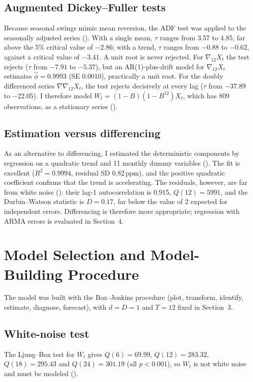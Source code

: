 \documentclass[11pt,letterpaper]{article}
\newcommand{\ppm}{\,ppm}
\newcommand{\nab}{\nabla}
\begin{document}
\subsection{Augmented Dickey--Fuller tests}
Because seasonal swings mimic mean reversion, the ADF test \citep{dickey1979} was applied to the seasonally adjusted series (). With a single mean, $\tau$ ranges from 3.57 to 4.85, far above the 5\% critical value of $-2.86$; with a trend, $\tau$ ranges from $-0.88$ to $-0.62$, against a critical value of $-3.41$. A unit root is never rejected. For $\nab_{12}X_t$ the test rejects ($\tau$ from $-7.91$ to $-5.37$), but an AR(1)-plus-drift model for $\nab_{12}X_t$ estimates $\hat\phi = 0.9993$ (SE 0.0010), practically a unit root. For the doubly differenced series $\nab\nab_{12}X_t$, the test rejects decisively at every lag ($\tau$ from $-37.89$ to $-22.05$). I therefore model $W_t = (1-B)(1-B^{12})X_t$, which has 809 observations, as a stationary series ().

\subsection{Estimation versus differencing}
As an alternative to differencing, I estimated the deterministic components by regression on a quadratic trend and 11 monthly dummy variables (). The fit is excellent ($R^2 = 0.9994$, residual SD 0.82\ppm), and the positive quadratic coefficient confirms that the trend is accelerating. The residuals, however, are far from white noise (): their lag-1 autocorrelation is 0.915, $Q(12) = 5991$, and the Durbin--Watson statistic is $D = 0.17$, far below the value of 2 expected for independent errors. Differencing is therefore more appropriate; regression with ARMA errors is evaluated in Section~4.

\section{Model Selection and Model-Building Procedure}
The model was built with the Box--Jenkins procedure \citep{box2015} (plot, transform, identify, estimate, diagnose, forecast), with $d=D=1$ and $T=12$ fixed in Section~3.

\subsection{White-noise test}
The Ljung--Box test \citep{ljung1978} for $W_t$ gives $Q(6)=69.99$, $Q(12)=283.32$, $Q(18)=295.43$ and $Q(24)=301.19$ (all $p<0.001$), so $W_t$ is not white noise and must be modeled ().
\end{document}
